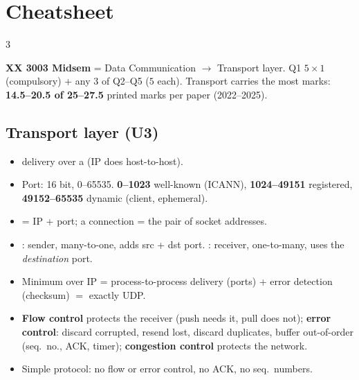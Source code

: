 \chapter*{Cheatsheet}

\begin{multicols*}{3}\footnotesize
\raggedright\setlength{\parindent}{0pt}\setlength{\parskip}{1pt}
\newcommand{\cshead}[1]{\par\smallskip{\sffamily\bfseries\color{sgteal}#1}\par\nopagebreak}
\setlength{\tabcolsep}{2.5pt}\raggedcolumns

\textbf{XX 3003 Midsem} = Data Communication $\to$ Transport layer. Q1 $5\times1$ (compulsory) + any 3 of Q2--Q5 ($5$ each).
Transport carries the most marks: \textbf{14.5--20.5 of 25--27.5} printed marks per paper (2022--2025). 

\section*{Transport layer (U3)}

\cshead{Services and ports} 
\begin{itemize}
  \item {} delivery over a  (IP does host-to-host).
  \item Port: 16 bit, 0--65535. \textbf{0--1023} well-known (ICANN), \textbf{1024--49151} registered, \textbf{49152--65535} dynamic (client, ephemeral).
  \item {} = IP + port; a connection = the pair of socket addresses.
  \item {}: sender, many-to-one, adds src + dst port. : receiver, one-to-many, uses the \emph{destination} port.
  \item Minimum over IP = process-to-process delivery (ports) + error detection (checksum) $=$ exactly UDP.
  \item \textbf{Flow control} protects the receiver (push needs it, pull does not); \textbf{error control}: discard corrupted, resend lost, discard duplicates, buffer out-of-order (seq.\ no., ACK, timer); \textbf{congestion control} protects the network.
  \item Simple protocol: no flow or error control, no ACK, no seq.\ numbers.
\end{itemize}


\end{multicols*}
